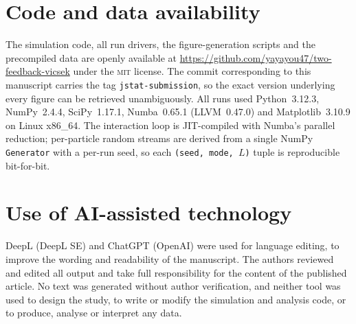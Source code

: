 \documentclass[11pt,a4paper]{article}
\begin{document}
\section*{Code and data availability}
The simulation code, all run drivers, the
figure-generation scripts and the precompiled data are openly
available at
\url{https://github.com/yayayou47/two-feedback-vicsek} under
the \textsc{mit} license. The commit corresponding to this
manuscript carries the tag \texttt{jstat-submission}, so the
exact version underlying every figure can be retrieved
unambiguously. All runs used
Python~3.12.3, NumPy~2.4.4, SciPy~1.17.1, Numba~0.65.1
(LLVM~0.47.0) and Matplotlib~3.10.9 on Linux x86\_64. The
interaction loop is JIT-compiled with Numba's parallel
reduction; per-particle random streams are derived from a
single NumPy \texttt{Generator} with a per-run seed, so
each \texttt{(seed, mode, $L$)} tuple is reproducible
bit-for-bit.

\section*{Use of AI-assisted technology}
%
%
DeepL (DeepL SE) and ChatGPT (OpenAI) were used for language editing,
to improve the wording and readability of the manuscript. The authors
reviewed and edited all output and take full responsibility for the
content of the published article. No text was generated without author
verification, and neither tool was used to design the study, to write
or modify the simulation and analysis code, or to produce, analyse or
interpret any data.



\end{document}
